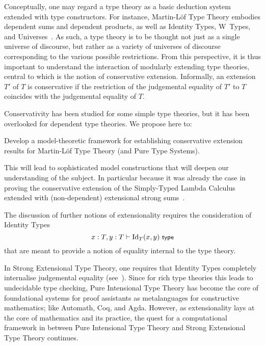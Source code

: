 \documentclass[11pt,twocolumn]{article}
\newcounter{CC}
\newenvironment{resenumerate}
  {\begin{list}{[\textbf{\arabic{CC}]}}
  {\usecounter{CC}
   \setlength{\topsep}{2pt}
   \setlength{\partopsep}{2pt}
   \setlength{\itemsep}{2.5pt}
   \setlength{\parsep}{2.5pt}
   \setlength{\leftmargin}{1.65em}
   \setlength{\labelwidth}{1.15em}
 }}
  {\end{list}}
\newcommand{\hide}[1]{}
\newcommand{\eg}{\emph{eg.}}
\newcommand{\vs}{\emph{vs.}}
\newcommand{\Id}{\mathrm{Id}}
\begin{document}
\hide{CwFs \vs~substitution algebras}

Conceptually, one may regard a type theory as a basic deduction system
extended with type constructors.  For instance, Martin-L\"of Type Theory
embodies dependent sums and dependent products, as well as Identity Types,
W~Types, and Universes~\cite{ProgMLTT}.  As such, a type theory is to be
thought not just as a single universe of discourse, but rather as a
variety of universes of discourse corresponding to the various possible
restrictions.  From this perspective, it is thus important to understand the
interaction of modularly extending type theories, central to which is the
notion of conservative extension.  Informally, an extension $T'$ of $T$ is
conservative if the restriction of the judgemental equality of $T'$ to $T$
coincides with the judgemental equality of $T$.

Conservativity has been studied for some simple type 
theories, %
but it has been overlooked for dependent type theories.  We propose here to:
\begin{resenumerate}\setcounter{CC}{3}
\item
  Develop a model-theoretic framework for establishing conservative
  extension results for Martin-L\"of Type Theory (and Pure Type Systems).
\end{resenumerate}
This will lead to sophisticated model constructions that will deepen our
understanding of the subject.  In particular because it was already the case
in proving the conservative extension of the Simply-Typed Lambda Calculus
extended with (non-dependent) extensional strong sums~\cite{FioreRemarks}.

The discussion of further notions of extensionality requires the consideration
of Identity Types
\[
  x:T,y:T\vdash\Id_T(x,y)\ \mbox{\small$\mathsf{type}$}
\]
that are meant to provide a notion of equality internal to the type theory.

In Strong Extensional Type Theory, one requires that Identity Types completely
internalise judgemental equality (see~\cite{MartinLofETT}).  Since for rich
type theories this leads to undecidable type checking, Pure Intensional Type
Theory has become the core of foundational systems for proof assistants as
metalanguages for constructive mathematics; like
Automath, %
Coq, %
and 
Agda. %
However, as extensionality lays at the core of mathematics and its practice,
the quest for a computational framework in between Pure Intensional Type
Theory and Strong Extensional Type Theory continues.
\end{document}
